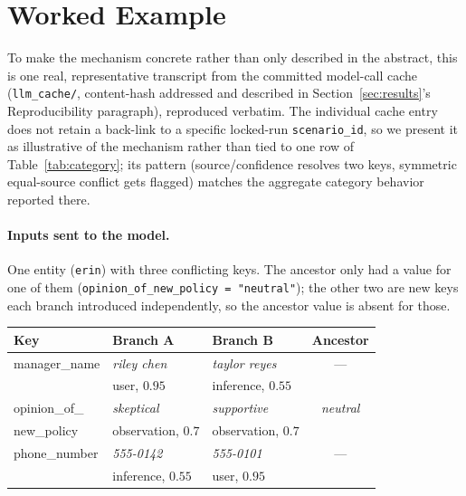 \documentclass[11pt]{article}
\begin{document}
\section{Worked Example}
\label{sec:example}

To make the mechanism concrete rather than only described in the abstract, this
is one real, representative transcript from the committed model-call cache
(\texttt{llm\_cache/}, content-hash addressed and described in Section~\ref{sec:results}'s
Reproducibility paragraph), reproduced verbatim. The individual cache entry does
not retain a back-link to a specific locked-run \texttt{scenario\_id}, so we
present it as illustrative of the mechanism rather than tied to one row of
Table~\ref{tab:category}; its pattern (source/confidence resolves two keys,
symmetric equal-source conflict gets flagged) matches the aggregate category
behavior reported there.

\paragraph{Inputs sent to the model.} One entity (\texttt{erin}) with three
conflicting keys. The ancestor only had a value for one of them
(\texttt{opinion\_of\_new\_policy = "neutral"}); the other two are new keys
each branch introduced independently, so the ancestor value is absent for
those.

\begin{center}
\small
\begin{tabular}{@{}lllc@{}}
\toprule
\textbf{Key} & \textbf{Branch A} & \textbf{Branch B} & \textbf{Ancestor} \\
\midrule
manager\_name & \emph{riley chen} & \emph{taylor reyes} & --- \\
 & \scriptsize user, $0.95$ & \scriptsize inference, $0.55$ & \\
opinion\_of\_ & \emph{skeptical} & \emph{supportive} & \emph{neutral} \\
new\_policy & \scriptsize observation, $0.7$ & \scriptsize observation, $0.7$ & \\
phone\_number & \emph{555-0142} & \emph{555-0101} & --- \\
 & \scriptsize inference, $0.55$ & \scriptsize user, $0.95$ & \\
\bottomrule
\end{tabular}
\end{center}
\end{document}
